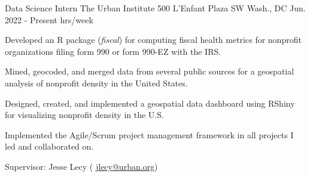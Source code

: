 



\begin{cventries}

  \cventry
    {Data Science Intern} %
    {The Urban Institute} %
    {500 L'Enfant Plaza SW
    Wash., DC} %
    {Jun. 2022 - Present  hrs/week} %
    {
      \begin{cvitems} %
        \item {Developed an R package (\textit{fiscal}) for computing fiscal health metrics for nonprofit organizations filing form 990 or form 990-EZ with the IRS.}
        \item {Mined, geocoded, and merged data from several public sources for a geospatial analysis of nonprofit density in the United States.}
        \item {Designed, created, and implemented a geospatial data dashboard using RShiny for visualizing nonprofit density in the U.S.}
        \item {Implemented the Agile/Scrum project management framework in all projects I led and collaborated on.}
        \item {Supervisor: Jesse Lecy ( \textcolor{navyblue}{\underline{\href{mailto:jlecy@urban.org}{jlecy@urban.org}}})}
      \end{cvitems}
    }



\end{cventries}
